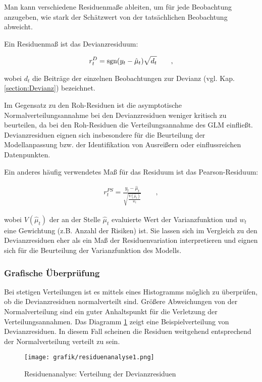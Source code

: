 Man kann verschiedene Residuenmaße ableiten, um für jede Beobachtung anzugeben, wie stark der Schätzwert von der tatsächlichen Beobachtung abweicht.

Ein Residuenmaß ist das Devianzresiduum:

\begin{eqnarray} 
r_t^D = \textnormal{sgn} (y_t - \hat{\mu}_t) \sqrt{d_t} \qquad ,
\end{eqnarray}

wobei $d_t$  die Beiträge der einzelnen Beobachtungen zur Devianz (vgl. Kap. \ref{section:Devianz}) bezeichnet.

Im Gegensatz zu den Roh-Residuen ist die asymptotische Normalverteilungsannahme bei den Devianzresiduen weniger kritisch zu beurteilen, da bei den Roh-Residuen die Verteilungsannahme des GLM einfließt. Devianzresiduen eignen sich insbesondere für die Beurteilung der Modellanpassung bzw. der Identifikation von Ausreißern oder einflussreichen Datenpunkten.

Ein anderes häufig verwendetes Maß für das Residuum ist das Pearson-Residuum: 

\begin{eqnarray} 
r_t^{PS} =  \frac {y_t - \hat{\mu}_t}   {\sqrt{\frac{V(\hat{\mu}_t)}{w_t}}}  \qquad ,
\end{eqnarray}


wobei $V(\hat{\mu}_t)$  der an der Stelle $\hat{\mu}_t$  evaluierte Wert der Varianzfunktion und $w_t$   eine Gewichtung (z.B. Anzahl der Risiken) ist. 
Sie lassen sich im Vergleich zu den Devianzresiduen eher als ein Maß der Residuenvariation interpretieren und eignen sich für die Beurteilung der Varianzfunktion des Modells.

\subsubsection{Grafische Überprüfung}

Bei stetigen Verteilungen ist es mittels eines Histogramms möglich zu überprüfen, ob die Devianzresiduen normalverteilt sind. Größere Abweichungen von der Normalverteilung sind ein guter Anhaltspunkt für die Verletzung der Verteilungsannahmen. Das Diagramm \ref{fig:residuenanalyse1} zeigt eine Beispielverteilung von Devianzresiduen. In diesem Fall scheinen die Residuen weitgehend entsprechend der Normalverteilung verteilt zu sein.

\begin{figure}  %
	\centering
  \texttt{[image: grafik/residuenanalyse1.png]}
      \caption{Residuenanalyse: Verteilung der Devianzresiduen}
	\label{fig:residuenanalyse1}
	
\end{figure} 	 


